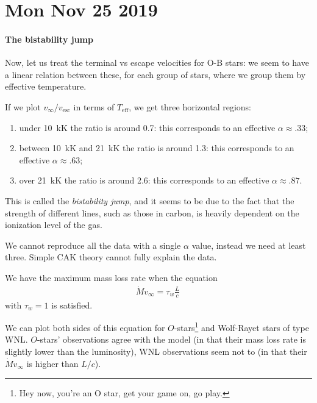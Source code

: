 \documentclass[main.tex]{subfiles}
\begin{document}
\section*{Mon Nov 25 2019}

\paragraph{The bistability jump}

Now, let us treat the terminal vs escape velocities for O-B stars: we seem to have a linear relation between these,  for each group of stars, where we group them by effective temperature. 

If we plot \(v_{ \infty }/ v _{\text{esc}}\) in terms of \(T _{\text{eff}}\), we get three horizontal regions: 
\begin{enumerate}
  \item under \SI{10}{\kilo\kelvin} the ratio is around \num{.7}: this corresponds to an effective \(\alpha \approx \num{.33}\);
  \item between \SI{10}{\kilo\kelvin} and \SI{21}{\kilo\kelvin} the ratio is around \num{1.3}: this corresponds to an effective \(\alpha \approx \num{.63}\);
  \item over \SI{21}{\kilo\kelvin} the ratio is around \num{2.6}: this corresponds to an effective \(\alpha \approx
  \num{.87}\). 
\end{enumerate}

This is called the \emph{bistability jump}, and it seems to be due to the fact that the strength of different lines, such as those in carbon, is heavily dependent on the ionization level of the gas.

We cannot reproduce all the data with a single \(\alpha \) value, instead we need at least three. Simple CAK theory cannot fully explain the data.

We have the maximum mass loss rate when the equation 
%
\begin{align}
  \dot{M} v_{ \infty } = \tau_{w} \frac{L}{c}   
\,
\end{align}
%
with \(\tau_{w} = 1\) is satisfied. 

We can plot both sides of this equation for \(O\)-stars\footnote{Hey now, you're an O star, get your game on, go play.} and Wolf-Rayet stars of type WNL.
\(O\)-stars' observations agree with the model (in that their mass loss rate is slightly lower than the luminosity), WNL observations seem not to (in that their \(\dot{M} v_{ \infty }\) is higher than \(L/c\)). 
\end{document}
